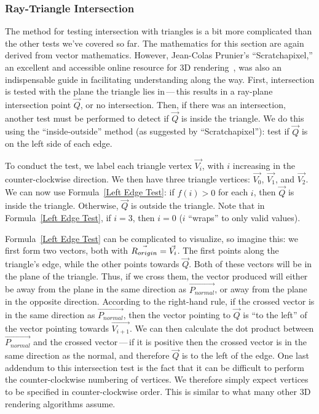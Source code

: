 \subsubsection{Ray-Triangle Intersection}

The method for testing intersection with triangles is a bit more complicated than the other tests we've covered so far.
The mathematics for this section are again derived from vector mathematics.
However, Jean-Colas Prunier's ``Scratchapixel,'' an excellent and accessible online resource for 3D rendering~\cite{prunier2017triangle}, was also an indispensable guide in facilitating understanding along the way.
First, intersection is tested with the plane the triangle lies in\,---\,this results in a ray-plane intersection point $\vec{Q}$, or no intersection.
Then, if there was an intersection, another test must be performed to detect if $\vec{Q}$ is inside the triangle.
We do this using the ``inside-outside'' method (as suggested by ``Scratchapixel''): test if $\vec{Q}$ is on the left side of each edge.

To conduct the test, we label each triangle vertex $\vec{V_i}$, with $i$ increasing in the counter-clockwise direction.
We then have three triangle vertices: $\vec{V_0}$, $\vec{V_1}$, and $\vec{V_2}$.
We can now use Formula~\ref{Left Edge Test}: if $f(i) > 0$ for each $i$, then $\vec{Q}$ is inside the triangle.
Otherwise, $\vec{Q}$ is outside the triangle.
Note that in Formula~\ref{Left Edge Test}, if $i = 3$, then $i = 0$ ($i$ ``wraps'' to only valid values).


Formula~\ref{Left Edge Test} can be complicated to visualize, so imagine this: we first form two vectors, both with $\vec{R_{origin}} = \vec{V_i}$.
The first points along the triangle's edge, while the other points towards $\vec{Q}$.
Both of these vectors will be in the plane of the triangle.
Thus, if we cross them, the vector produced will either be away from the plane in the same direction as $\vec{P_{normal}}$, or away from the plane in the opposite direction.
According to the right-hand rule, if the crossed vector is in the same direction as $\vec{P_{normal}}$, then the vector pointing to $\vec{Q}$ is ``to the left'' of the vector pointing towards $\vec{V_{i+1}}$.
We can then calculate the dot product between $\vec{P_{normal}}$ and the crossed vector\,---\,if it is positive then the crossed vector is in the same direction as the normal, and therefore $\vec{Q}$ is to the left of the edge.
One last addendum to this intersection test is the fact that it can be difficult to perform the counter-clockwise numbering of vertices.
We therefore simply expect vertices to be specified in counter-clockwise order.
This is similar to what many other 3D rendering algorithms assume.


